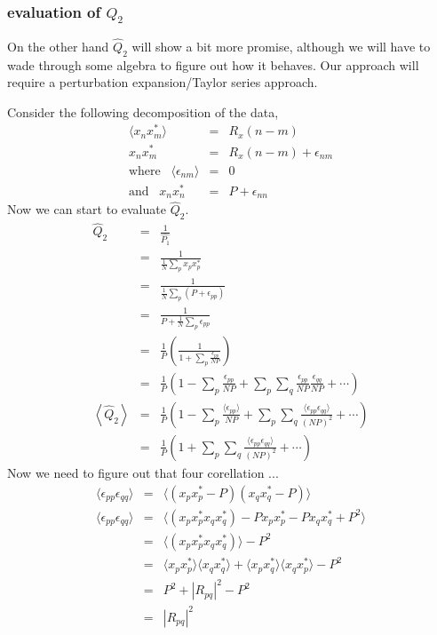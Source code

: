 \subsubsection{evaluation of $Q_2$}

On the other hand $\hat{Q}_2$ will show a bit more promise, although
we will have to wade through some algebra to figure out how it
behaves.  Our approach will require a perturbation expansion/Taylor
series approach.

Consider the following decomposition of the data,
\begin{eqnarray}
\langle x_n x_m^\ast \rangle &=& R_x(n-m) \\
x_n x_m^\ast &=& R_x(n-m) + \epsilon_{nm} \\
\textrm{where} \;\;\; \langle \epsilon_{nm} \rangle &=& 0 \\
\textrm{and} \;\;\; x_n x_n^\ast &=& P + \epsilon_{nn} 
\end{eqnarray}
Now we can start to evaluate $\hat{Q}_2$.
\begin{eqnarray}
\hat{Q}_2 &=& \frac{1}{\hat{P_1}} \\
&=& \frac{1}{\frac{1}{N}\sum_p x_p x_p^\ast} \\
&=& \frac{1}{\frac{1}{N}\sum_p (P + \epsilon_{pp})} \\
&=& \frac{1}{P + \frac{1}{N}\sum_p \epsilon_{pp}} \\
&=& \frac{1}{P}\left(\frac{1}{1 + \sum_p \frac{\epsilon_{pp}}{NP}}\right) \\
&=& \frac{1}{P}\left(1 -  \sum_p  \frac{\epsilon_{pp}}{NP} + 
\sum_p \sum_q  \frac{\epsilon_{pp}}{NP} \frac{\epsilon_{qq}}{NP} +
\cdots \right) \\
%
\left\langle \hat{Q}_2 \right\rangle &=& \frac{1}{P} \left( 1 - 
\sum_p  \frac{\langle \epsilon_{pp}\rangle}{NP} + 
\sum_p \sum_q  \frac{\langle \epsilon_{pp} \epsilon_{qq}\rangle}{(NP)^2} +
\cdots \right) \\
&=& \frac{1}{P} \left( 1 + \sum_p \sum_q  \frac{\langle \epsilon_{pp} \epsilon_{qq}\rangle}{(NP)^2} +
\cdots \right) 
\end{eqnarray}
Now we need to figure out that four corellation ...
\begin{eqnarray}
\langle \epsilon_{pp} \epsilon_{qq} \rangle &=& 
\langle (x_p x^\ast_p - P) (x_q x^\ast_q - P) \rangle \\
\langle \epsilon_{pp} \epsilon_{qq} \rangle &=& 
\langle (x_p x^\ast_p x_q x^\ast_q) - P x_p x^\ast_p - P x_q x^\ast_q + P^2 \rangle \\
&=& \langle (x_p x^\ast_p x_q x^\ast_q)\rangle - P^2 \\
&=& \langle x_p x^\ast_p \rangle \langle x_q x^\ast_q \rangle
+\langle x_p x^\ast_q\rangle \langle x_q x^\ast_p \rangle - P^2 \\
&=& P^2 + |R_{pq}|^2 - P^2 \\
&=& |R_{pq}|^2
\end{eqnarray}
